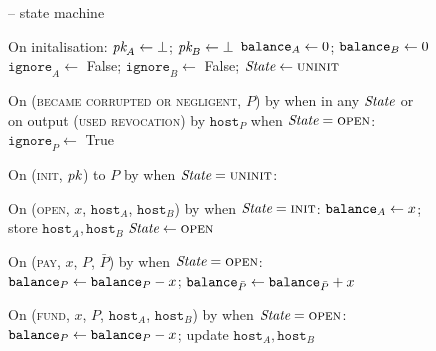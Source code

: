 \begin{figure}[H]
  \begin{systembox}{\fchan{} -- state machine}
    \begin{algorithmic}[1]
      \State On initalisation:
      \label{code:functionality:state-machine:boot}
      \Indent
        \State $\textit{pk}_{A} \gets \bot$; $\textit{pk}_{B} \gets \bot$
        \State $\texttt{balance}_{A} \gets 0$; $\texttt{balance}_{B} \gets 0$
        \State $\texttt{ignore}_A \gets$ False;
        $\texttt{ignore}_B \gets$ False;
        \State $\itistate \gets \textsc{uninit}$
      \EndIndent
      \Statex

      \State On (\textsc{became corrupted or negligent}, $P$) by \adversary when
      in any $\itistate$ or on output (\textsc{used revocation}) by
      $\texttt{host}_P$ when $\itistate = \textsc{open}$:
      \Indent
        \State $\texttt{ignore}_P \gets$ True
         
      \EndIndent
      \Statex

      \State On (\textsc{init}, $\textit{pk}_{}$) to $P$ by \environment when $\itistate
      = \textsc{uninit}$:
      \Indent
      \EndIndent
      \Statex

      \State On (\textsc{open}, $x$, $\texttt{host}_A$, $\texttt{host}_B$) by
      \adversary when $\itistate = \textsc{init}$:
      \label{code:functionality:state-machine:when-open}
      \Indent
        \State $\texttt{balance}_{A} \gets x$; store $\texttt{host}_A, \texttt{host}_B$
        \State $\itistate \gets \textsc{open}$
      \EndIndent
      \Statex

      \State On (\textsc{pay}, $x$, $P$, $\bar{P}$) by \adversary when
      $\itistate = \textsc{open}$: 
      \label{code:functionality:state-machine:when-pay}
      \Indent
        \State $\texttt{balance}_{P} \gets \texttt{balance}_{P} - x$; $\texttt{balance}_{\bar{P}} \gets
        \texttt{balance}_{\bar{P}} + x$
      \EndIndent
      \Statex

      \State On (\textsc{fund}, $x$, $P$, $\texttt{host}_A$, $\texttt{host}_B$)
      by \adversary when $\itistate = \textsc{open}$:
      \label{code:functionality:state-machine:when-fund}
      \Indent
        \State $\texttt{balance}_{P} \gets \texttt{balance}_{P} - x$; update $\texttt{host}_A,
        \texttt{host}_B$
      \EndIndent
      \Statex


\end{algorithmic}
\end{systembox}
\end{figure}
